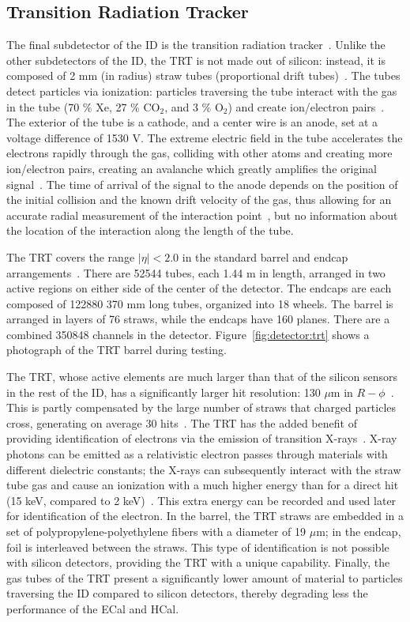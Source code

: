 \subsection{Transition Radiation Tracker}
\label{detector:ID:TRT}
The final subdetector of the ID is the transition radiation tracker~\cite{ATLASPaper}. Unlike the other subdetectors of the ID, the TRT is not made out of silicon: instead, it is composed of 2 mm (in radius) straw tubes (proportional drift tubes)~\cite{ATLASPaper}. The tubes detect particles via ionization: particles traversing the tube interact with the gas in the tube (70 $\%$ Xe, 27 \% CO$_2$, and 3 \% O$_2$) and create ion/electron pairs~\cite{Detectors,ATLASPaper}. The exterior of the tube is a cathode, and a center wire is an anode, set at a voltage difference of 1530 V. The extreme electric field in the tube accelerates the electrons rapidly through the gas, colliding with other atoms and creating more ion/electron pairs, creating an avalanche which greatly amplifies the original signal~\cite{Detectors}. The time of arrival of the signal to the anode depends on the position of the initial collision and the known drift velocity of the gas, thus allowing for an accurate radial measurement of the interaction point~\cite{TRTReadout}, but no information about the location of the interaction along the length of the tube.

The TRT covers the range $|\eta| < 2.0$ in the standard barrel and endcap arrangements~\cite{TRTPaper}. There are 52544 tubes, each 1.44 m in length, arranged in two active regions on either side of the center of the detector. The endcaps are each composed of 122880 370 mm long tubes, organized into 18 wheels. The barrel is arranged in layers of 76 straws, while the endcaps have 160 planes. There are a combined 350848 channels in the detector. Figure~\ref{fig:detector:trt} shows a photograph of the TRT barrel during testing.

The TRT, whose active elements are much larger than that of the silicon sensors in the rest of the ID, has a significantly larger hit resolution: 130 $\mu$m in $R-\phi$~\cite{ATLASPaper}. This is partly compensated by the large number of straws that charged particles cross, generating on average 30 hits~\cite{ATLASExpected}. The TRT has the added benefit of providing identification of electrons via the emission of transition X-rays~\cite{TRTPID}. X-ray photons can be emitted as a relativistic electron passes through materials with different dielectric constants; the X-rays can subsequently interact with the straw tube gas and cause an ionization with a much higher energy than for a direct hit (15 keV, compared to 2 keV)~\cite{TRTReadout}. This extra energy can be recorded and used later for identification of the electron. In the barrel, the TRT straws are embedded in a set of polypropylene-polyethylene fibers with a diameter of 19 $\mu$m; in the endcap, foil is interleaved between the straws. This type of identification is not possible with silicon detectors, providing the TRT with a unique capability. Finally, the gas tubes of the TRT present a significantly lower amount of material to particles traversing the ID compared to silicon detectors, thereby degrading less the performance of the ECal and HCal.


